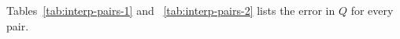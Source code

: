 \documentclass[12pt, a4paper]{article}
\theoremstyle{plain}
\theoremstyle{definition}
\theoremstyle{remark}
\theoremstyle{definition}
\begin{document}
Tables~\ref{tab:interp-pairs-1} and ~\ref{tab:interp-pairs-2} lists the error in $Q$ for every pair.

\end{document}
